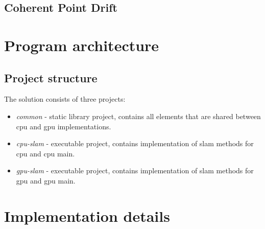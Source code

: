 \documentclass[titlepage]{article}
\begin{document}
\subsection{Coherent Point Drift}

\section{Program architecture}
\subsection{Project structure}
The solution consists of three projects:
\begin{itemize}
\item \textit{common} - static library project, contains all elements that are shared between cpu and gpu implementations.
\item \textit{cpu-slam} - executable project, contains implementation of slam methods for cpu and cpu main.
\item \textit{gpu-slam} - executable project, contains implementation of slam methods for gpu and gpu main.
\end{itemize}

\section{Implementation details}
\end{document}
